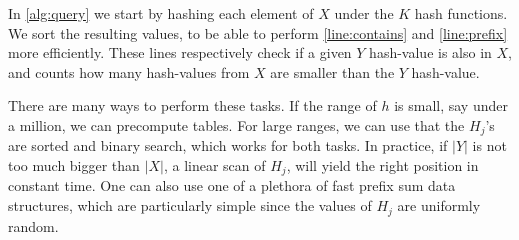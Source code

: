 In \cref{alg:query} we start by hashing each element of $X$ under the $K$ hash functions.
We sort the resulting values, to be able to perform \cref{line:contains} and \cref{line:prefix} more efficiently.
These lines respectively check if a given $Y$ hash-value is also in $X$, and counts how many hash-values from $X$ are smaller than the $Y$ hash-value.

There are many ways to perform these tasks.
If the range of $h$ is small, say under a million, we can precompute tables.
For large ranges, we can use that the $H_j$'s are sorted and binary search, which works for both tasks.
In practice, if $|Y|$ is not too much bigger than $|X|$, a linear scan of $H_j$, will yield the right position in constant time.
One can also use one of a plethora of fast prefix sum data structures, which are particularly simple since the values of $H_j$ are uniformly random.
